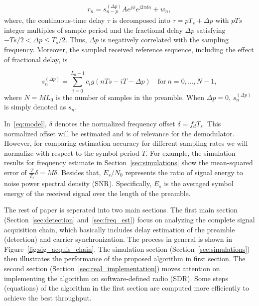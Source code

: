 \begin{equation}
    \begin{aligned}
      \label{eq:model}
      r_n = s_{n-p}^{(\Delta p)}Ae^{j\phi}e^{j2\pi\delta n}+w_{n},
    \end{aligned}
  \end{equation}
where, the continuous-time delay $\tau$ is decomposed into $\tau=pT_s+\Delta p$ with $pTs$ integer multiples of sample period and 
the fractional delay $\Delta p$ satisfying $-Ts/2 {<} \Delta p {\leq} T_s/2$. Thus, $\Delta p$ is negatively correlated with
the sampling frequency. Moreover, the sampled received reference sequence, including the effect of fractional delay, is

\begin{equation}
  \label{eq:l_ref_sig_discrete}
  s_n^{(\Delta p)} = \sum_{i=0}^{L_0-1} c_i g(nTs-iT-\Delta p) \quad \text{for}~n=0,\ldots,N-1,
\end{equation}
where $N=ML_0$ is the number of samples in the preamble. When $\Delta p=0$, $s_n^{(\Delta p)}$ is simply denoted as $s_n$.

In~\eqref{eq:model}, $\delta$ denotes the normalized frequency offset $\delta=f_dT_s$. This normalized offset
will be estimated and is of relevance for the demodulator. However, for comparing estimation accuracy for different
sampling rates we will normalize with respect to the symbol period $T$. For example, the simulation results for frequency estimate 
in Section~\ref{sec:simulations} show the mean-squared error of $\frac{T}{T_s}\delta=M\delta$.
Besides that, $E_s/N_0$ represents the ratio of signal energy to noise power spectral density (SNR).
Specifically, $E_s$ is the averaged symbol energy of the received signal over the length of the preamble.

The rest of paper is seperated into two main sections. The first main section (Section~\ref{sec:detection} and~\ref{sec:freq_est}) focus on analyzing the complete
signal acquisition chain, which basically includes delay estimation of the preamble (detection) and
carrier synchronization. The process in general is shown in Figure~\ref{fig:sig_acquis_chain}.
The simulation section (Section~\ref{sec:simulations}) then illustrates the performance of the proposed algorithm in first section.
The second section (Section~\ref{sec:real_implementation}) moves attention on implementing the algorithm 
on software-defined radio (SDR). Some steps (equations) of the algorithm in the first section are computed more efficiently to achieve the best throughput.

